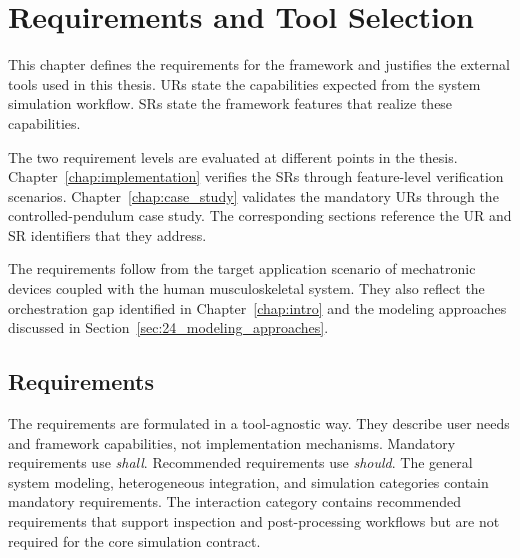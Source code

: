\chapter{Requirements and Tool Selection}
\label{chap:requirements}

\makeatletter
\newcommand{\reqid}[1]{\strut\phantomsection\begingroup\def\@currentlabel{#1}\label{req:#1}\endgroup #1}
\newcommand{\reqidbf}[1]{\strut\phantomsection\begingroup\def\@currentlabel{#1}\label{req:#1}\endgroup\textbf{#1}}
\makeatother

This chapter defines the requirements for the \syssimx{} framework and justifies the external tools used in this thesis.
\Acp{UR} state the capabilities expected from the system simulation workflow.
\Acp{SR} state the framework features that realize these capabilities.

The two requirement levels are evaluated at different points in the thesis.
Chapter~\ref{chap:implementation} verifies the \acp{SR} through feature-level verification scenarios.
Chapter~\ref{chap:case_study} validates the mandatory \acp{UR} through the controlled-pendulum case study.
The corresponding sections reference the \ac{UR} and \ac{SR} identifiers that they address.

The requirements follow from the target application scenario of mechatronic devices coupled with the human musculoskeletal system.
They also reflect the orchestration gap identified in Chapter~\ref{chap:intro} and the modeling approaches discussed in Section~\ref{sec:24_modeling_approaches}.

\section{Requirements}

The requirements are formulated in a tool-agnostic way.
They describe user needs and framework capabilities, not implementation mechanisms.
Mandatory requirements use \emph{shall}.
Recommended requirements use \emph{should}.
The general system modeling, heterogeneous integration, and simulation categories contain mandatory requirements.
The interaction category contains recommended requirements that support inspection and post-processing workflows but are not required for the core simulation contract.






